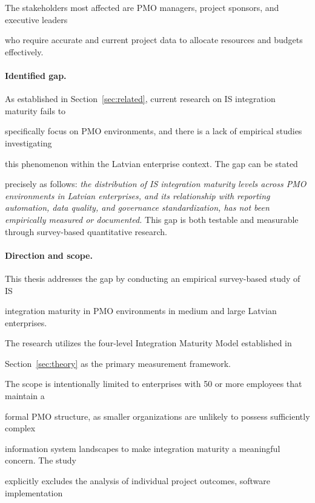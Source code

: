 The stakeholders most affected are PMO managers, project sponsors, and executive leaders 

who require accurate and current project data to allocate resources and budgets effectively. 

 

\paragraph{Identified gap.} 

As established in Section~\ref{sec:related}, current research on IS integration maturity fails to 

specifically focus on PMO environments, and there is a lack of empirical studies investigating 

this phenomenon within the Latvian enterprise context. The gap can be stated  

precisely as follows: \emph{the distribution of IS integration maturity levels across PMO environments in Latvian enterprises, and its relationship with reporting automation, data quality, and governance standardization, has not been empirically measured or documented.}
This gap is both testable and measurable through survey-based quantitative research. 

 

\paragraph{Direction and scope.} 

This thesis addresses the gap by conducting an empirical survey-based study of IS 

integration maturity in PMO environments in medium and large Latvian enterprises.  

The research utilizes the four-level Integration Maturity Model established in 

Section~\ref{sec:theory} as the primary measurement framework.  

The scope is intentionally limited to enterprises with 50 or more employees that maintain a  

formal PMO structure, as smaller organizations are unlikely to possess sufficiently complex 

information system landscapes to make integration maturity a meaningful concern. The study 

explicitly excludes the analysis of individual project outcomes, software implementation 

